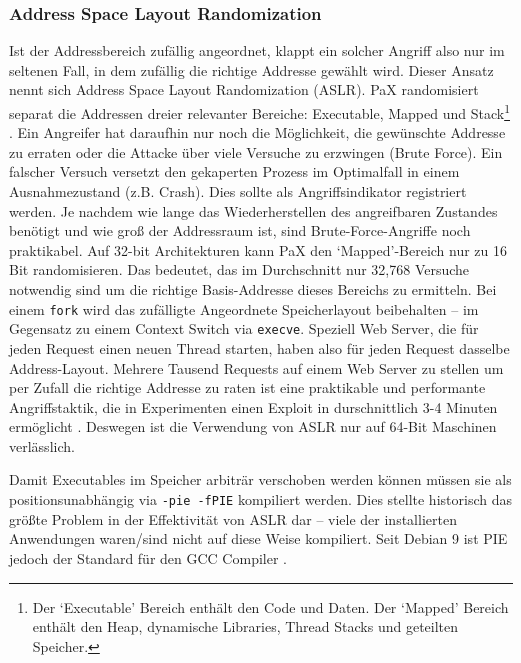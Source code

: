 \subsubsection{Address Space Layout Randomization}
\label{sec:aslr}

Ist der Addressbereich zufällig angeordnet, klappt ein solcher Angriff also nur im seltenen Fall, in dem zufällig die richtige Addresse gewählt wird. Dieser Ansatz nennt sich Address Space Layout Randomization (ASLR). PaX randomisiert separat die Addressen dreier relevanter Bereiche: Executable, Mapped und Stack\footnote{Der `Executable' Bereich  enthält den
Code und Daten. Der `Mapped' Bereich enthält den Heap, dynamische Libraries, Thread Stacks und geteilten Speicher.} \cite{pax-aslr}.
Ein Angreifer hat daraufhin nur noch die Möglichkeit, die gewünschte Addresse zu erraten oder die Attacke über viele Versuche zu erzwingen (Brute Force). Ein falscher Versuch versetzt den gekaperten Prozess im Optimalfall in einem Ausnahmezustand (z.B. Crash). Dies sollte als Angriffsindikator registriert werden. Je nachdem wie lange das Wiederherstellen des
angreifbaren Zustandes benötigt und wie groß der Addressraum ist, sind Brute-Force-Angriffe noch praktikabel. Auf 32-bit Architekturen kann PaX den `Mapped'-Bereich nur zu 16 Bit randomisieren. Das bedeutet, das im Durchschnitt nur 32,768 Versuche notwendig sind um die richtige Basis-Addresse dieses Bereichs zu ermitteln. Bei einem \texttt{fork} wird das zufälligte Angeordnete Speicherlayout beibehalten -- im Gegensatz zu einem Context Switch via \texttt{execve}. Speziell Web Server,
die für jeden Request einen neuen Thread starten, haben also für jeden Request dasselbe Address-Layout. Mehrere Tausend Requests auf einem Web Server zu stellen um per Zufall die richtige Addresse zu raten ist eine praktikable und performante Angriffstaktik, die in Experimenten einen Exploit in durschnittlich 3-4 Minuten ermöglicht \cite{shacham_2004}.
Deswegen ist die Verwendung von ASLR nur auf 64-Bit Maschinen verlässlich.

Damit Executables im Speicher arbiträr verschoben werden können müssen sie als positionsunabhängig via \texttt{-pie -fPIE} kompiliert werden. Dies stellte historisch das größte Problem in der Effektivität von ASLR dar -- viele der installierten Anwendungen waren/sind nicht auf diese Weise kompiliert. Seit Debian 9 ist PIE jedoch der Standard für den GCC Compiler \cite{debian-9}.

